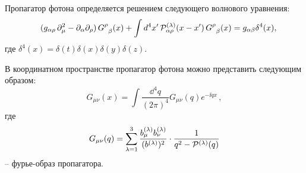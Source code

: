 Пропагатор фотона определяется решением следующего волнового уравнения:
\begin{eqnarray}\label{eq:WaveEq}
	\nonumber
	&& 
	(g_{\alpha \rho} \, \partial_{\mu}^2  -
	\partial_{\alpha}\partial_{\rho}) \, G^{\rho}_{\phantom{x}\beta}(x) + 
	\int d^4 x'\, {\cal P}^{(\lambda)}_{\alpha\rho} (x - x') \, 
	G^{\rho}_{\phantom{x}\beta}(x)
	\nonumber= g_{\alpha\beta}\delta^4(x),
	\label{eq:2}
\end{eqnarray}
где $\delta^4(x)=\delta(t)\delta(x)\delta(y)\delta(z)$. 

В координатном пространстве пропагатор фотона можно представить следующим 
образом:
\begin{equation}\label{eq:InvGcFourier}
	G_{\mu\nu}(x)=\int \frac{\dd^4q}{(2\pi)^4}G_{\mu\nu}(q) e^{-\ii qx}\, ,
\end{equation}
где
\begin{equation}\label{eq:GcFourier}
	G_{\mu\nu}(q)=\sum_{\lambda=1}^{3}\frac{b_\mu^{(\lambda)}b^{(\lambda)}_\nu}{(b^{(\lambda)})^2}\cdot
	 \frac{1}{q^2-{\cal P}^{(\lambda)}(q)}
\end{equation}
-- фурье-образ пропагатора.


